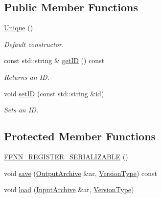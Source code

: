 \subsection*{Public Member Functions}
\begin{DoxyCompactItemize}
\item 
\hyperlink{classffnn_1_1traits_1_1_unique_a216b6dfb9074ccaedacafe5a9e3b953a}{Unique} ()
\begin{DoxyCompactList}\small\item\em Default constructor. \end{DoxyCompactList}\item 
const std\-::string \& \hyperlink{classffnn_1_1traits_1_1_unique_ab6971fdaf349b0a42a8c5627cf7b6f58}{get\-I\-D} () const 
\begin{DoxyCompactList}\small\item\em Returns an I\-D. \end{DoxyCompactList}\item 
void \hyperlink{classffnn_1_1traits_1_1_unique_aef0d2ee90f910cc5143974d6051cc340}{set\-I\-D} (const std\-::string \&id)
\begin{DoxyCompactList}\small\item\em Sets an I\-D. \end{DoxyCompactList}\end{DoxyCompactItemize}
\subsection*{Protected Member Functions}
\begin{DoxyCompactItemize}
\item 
\hyperlink{classffnn_1_1traits_1_1_unique_ac148b363df35196340005f9195db26bd}{F\-F\-N\-N\-\_\-\-R\-E\-G\-I\-S\-T\-E\-R\-\_\-\-S\-E\-R\-I\-A\-L\-I\-Z\-A\-B\-L\-E} ()
\item 
void \hyperlink{classffnn_1_1traits_1_1_unique_ad8be6fcb9a7519603b2aab19b3c6d593}{save} (\hyperlink{classffnn_1_1traits_1_1_serializable_a08d986df75d363fa79506d4f6045cb9f}{Output\-Archive} \&ar, \hyperlink{classffnn_1_1traits_1_1_serializable_a08924b3b7d20cb3cb6eafe517d4f7b30}{Version\-Type}) const 
\item 
void \hyperlink{classffnn_1_1traits_1_1_unique_af1e937c2908ed2ff707d6a7d1b5b13d2}{load} (\hyperlink{classffnn_1_1traits_1_1_serializable_a6e626759259f8f370dd4303b4441a234}{Input\-Archive} \&ar, \hyperlink{classffnn_1_1traits_1_1_serializable_a08924b3b7d20cb3cb6eafe517d4f7b30}{Version\-Type})
\end{DoxyCompactItemize}
